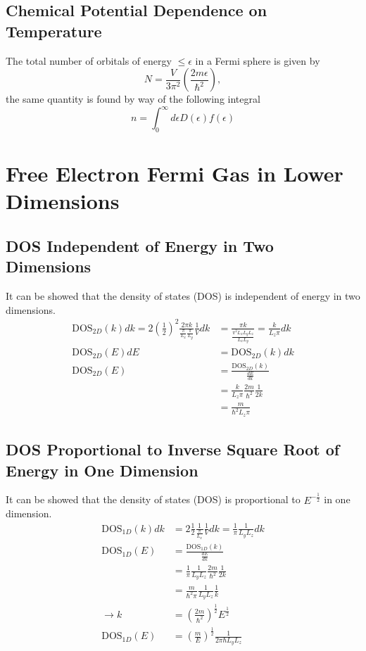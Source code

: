 \documentclass[11pt]{amsart}
\begin{document}
\subsection{Chemical Potential Dependence on Temperature}

The total number of orbitals of energy $\leq \epsilon$  in a Fermi sphere is given by
\begin{equation}
N = \frac{V}{3\pi^2}\left(\frac{2m \epsilon}{\hbar^2} \right),
\end{equation}
the same quantity is found by way of the following integral
\begin{equation}
n = \int_0^{\infty} d\epsilon D(\epsilon) f(\epsilon)
\end{equation}

\section{Free Electron Fermi Gas in Lower Dimensions}

\subsection{DOS Independent of Energy in Two Dimensions}
It can be showed that the density of states (DOS) is independent of energy in two dimensions.
\begin{align*}
\text{DOS}_{2D}(k) dk = 2\left(\frac{1}{2} \right)^2\frac{2\pi k}{\frac{\pi}{L_x}\frac{\pi}{L_y}}\frac{1}{V} dk &= \frac{\pi k}{\frac{\pi^2L_xL_yL_z}{L_xL_y}}=\frac{k}{L_z\pi} dk \\
\text{DOS}_{2D}(E) dE &= \text{DOS}_{2D}(k) dk \\
\text{DOS}_{2D}(E) &= \frac{\text{DOS}_{2D}(k)}{\frac{dE}{dk}} \\
				&= \frac{k}{L_z\pi}\frac{2m}{\hbar^2}\frac{1}{2k} \\
				&= \frac{m}{\hbar^2L_z\pi}
\end{align*}

\subsection{DOS Proportional to Inverse Square Root of Energy in One Dimension}
It can be showed that the density of states (DOS) is proportional to $E^{-\frac{1}{2}}$ in one dimension.
\begin{align*}
\text{DOS}_{1D}(k)dk &= 2\frac{1}{2}\frac{1}{\frac{\pi}{L_x}}\frac{1}{V}dk = \frac{1}{\pi}\frac{1}{L_yL_z}dk \\
\text{DOS}_{1D}(E) &= \frac{\text{DOS}_{1D}(k)}{\frac{dE}{dk}} \\
 &=  \frac{1}{\pi}\frac{1}{L_yL_z}\frac{2m}{\hbar^2}\frac{1}{2k} \\
 &= \frac{m}{\hbar^2\pi}\frac{1}{L_yL_z}\frac{1}{k} \\ 
\rightarrow k &= \left(\frac{2m}{\hbar^2}\right)^{\frac{1}{2}} E^{\frac{1}{2}} \\
\text{DOS}_{1D}(E) &= \left(\frac{m}{E} \right)^{\frac{1}{2}} \frac{1}{2\pi\hbar L_y L_z}
\end{align*}
\end{document}
